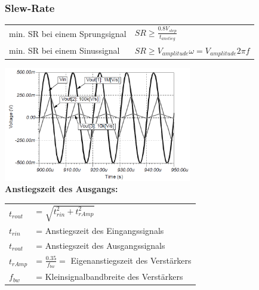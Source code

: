 		\subsubsection{Slew-Rate}
			\begin{tabular}{ll}
				min. SR bei einem Sprungsignal &
				$SR\geq\frac{0.8V_{step}}{t_{anstieg}}$\\ 
				min. SR bei einem Sinussignal & 
				$SR\geq V_{amplitude}\omega=V_{amplitude}2\pi f$\\
			\end{tabular}

			\includegraphics[height=5cm]{./images/slew-rate.png}\\

			{\bf Anstiegszeit des Ausgangs:} \\
			\begin{tabular}{ll}
				$t_{rout}$ & = $\sqrt{t_{rin}^2 + t_{rAmp}^2}$ \\
				$t_{rin}$  & = Anstiegszeit des Eingangssignals \\
				$t_{rout}$ & = Anstiegszeit des Ausgangssignals \\
				$t_{rAmp}$ & = $\frac{0.35}{f_{bw}} = $ Eigenanstiegszeit des Verstärkers \\
				$f_{bw}$   & = Kleinsignalbandbreite des Verstärkers \\
			\end{tabular}

